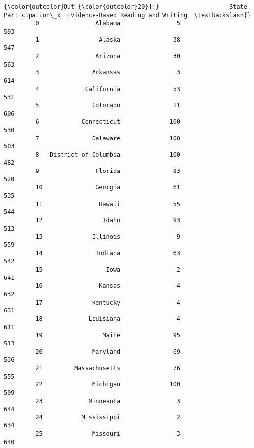 \documentclass[11pt]{article}
\begin{document}
\begin{Verbatim}[commandchars=\\\{\}]
{\color{outcolor}Out[{\color{outcolor}20}]:}                    State  Participation\_x  Evidence-Based Reading and Writing  \textbackslash{}
         0                Alabama                5                                 593   
         1                 Alaska               38                                 547   
         2                Arizona               30                                 563   
         3               Arkansas                3                                 614   
         4             California               53                                 531   
         5               Colorado               11                                 606   
         6            Connecticut              100                                 530   
         7               Delaware              100                                 503   
         8   District of Columbia              100                                 482   
         9                Florida               83                                 520   
         10               Georgia               61                                 535   
         11                Hawaii               55                                 544   
         12                 Idaho               93                                 513   
         13              Illinois                9                                 559   
         14               Indiana               63                                 542   
         15                  Iowa                2                                 641   
         16                Kansas                4                                 632   
         17              Kentucky                4                                 631   
         18             Louisiana                4                                 611   
         19                 Maine               95                                 513   
         20              Maryland               69                                 536   
         21         Massachusetts               76                                 555   
         22              Michigan              100                                 509   
         23             Minnesota                3                                 644   
         24           Mississippi                2                                 634   
         25              Missouri                3                                 640   

\end{Verbatim}
\end{document}
